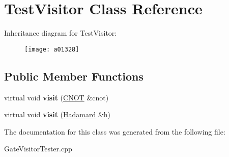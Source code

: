 \hypertarget{a01328}{}\section{Test\+Visitor Class Reference}
\label{a01328}
Inheritance diagram for Test\+Visitor\+:\begin{figure}[H]
\begin{center}
\leavevmode
\texttt{[image: a01328]}
\end{center}
\end{figure}
\subsection*{Public Member Functions}
\begin{DoxyCompactItemize}
\item 
\mbox{\label{a01328_a2766c0664632ae33300eb9e663a26005}} 
virtual void {\bfseries visit} (\hyperlink{a01300}{C\+N\+OT} \&cnot)
\item 
\mbox{\label{a01328_a0a0f77d3f19f9bda449318a52031f2d4}} 
virtual void {\bfseries visit} (\hyperlink{a01308}{Hadamard} \&h)
\end{DoxyCompactItemize}


The documentation for this class was generated from the following file\+:\begin{DoxyCompactItemize}
\item 
Gate\+Visitor\+Tester.\+cpp\end{DoxyCompactItemize}

